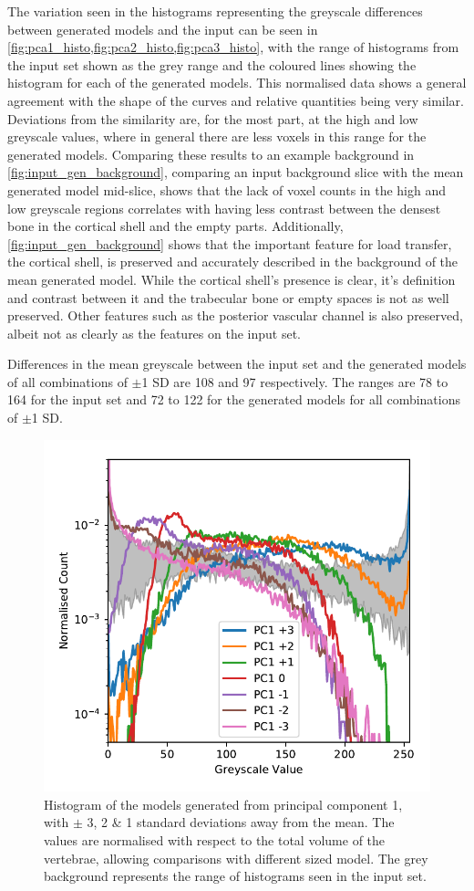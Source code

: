 The variation seen in the histograms representing the greyscale differences between generated models and the input can be seen in \cref{fig:pca1_histo,fig:pca2_histo,fig:pca3_histo}, with the range of histograms from the input set shown as the grey range and the coloured lines showing the histogram for each of the generated models.
This normalised data shows a general agreement with the shape of the curves and relative quantities being very similar.
Deviations from the similarity are, for the most part, at the high and low greyscale values, where in general there are less voxels in this range for the generated models.
Comparing these results to an example background in \cref{fig:input_gen_background}, comparing an input background slice with the mean generated model mid-slice, shows that the lack of voxel counts in the high and low greyscale regions correlates with having less contrast between the densest bone in the cortical shell and the empty parts.
Additionally, \cref{fig:input_gen_background} shows that the important feature for load transfer, the cortical shell, is preserved and accurately described in the background of the mean generated model.
While the cortical shell's presence is clear, it's definition and contrast between it and the trabecular bone or empty spaces is not as well preserved.
Other features such as the posterior vascular channel is also preserved, albeit not as clearly as the features on the input set.

Differences in the mean greyscale between the input set and the generated models of all combinations of $\pm$1 SD are 108 and 97 respectively.
The ranges are 78 to 164 for the input set and 72 to 122 for the generated models for all combinations of $\pm$1 SD.
\begin{figure}[h!]
  \centering
  \includegraphics[width=.65\textwidth]{Chapters/Chapter_PCA_images/pca1_histo.pdf}
  \caption{Histogram of the models generated from principal component 1, with $\pm$ 3, 2 \& 1 standard deviations away from the mean. The values are normalised with respect to the total volume of the vertebrae, allowing comparisons with different sized model. The grey background represents the range of histograms seen in the input set.}
  \label{fig:pca1_histo}
\end{figure}

